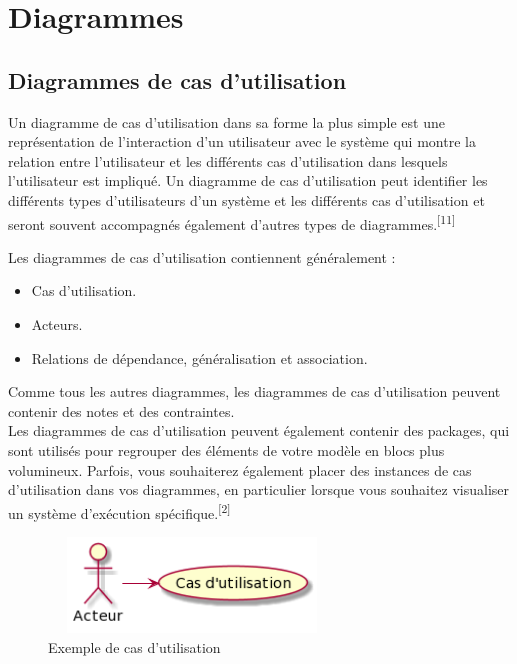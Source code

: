 \documentclass[12pt]{report}
\begin{document}
\newpage

\section{Diagrammes}

\subsection{Diagrammes de cas d'utilisation}

Un diagramme de cas d'utilisation dans sa forme la plus simple est une représentation de l'interaction d'un utilisateur avec le système qui montre la relation entre l'utilisateur et les différents cas d'utilisation dans lesquels l'utilisateur est impliqué. Un diagramme de cas d'utilisation peut identifier les différents types d'utilisateurs d'un système et les différents cas d'utilisation et seront souvent accompagnés également d'autres types de diagrammes.\textsuperscript{[11]}

Les diagrammes de cas d'utilisation contiennent généralement :

\begin{itemize}
\item Cas d'utilisation.
\item Acteurs.
\item Relations de dépendance, généralisation et association.
\end{itemize}

Comme tous les autres diagrammes, les diagrammes de cas d'utilisation peuvent contenir des notes et des contraintes.
\\
Les diagrammes de cas d'utilisation peuvent également contenir des packages, qui sont utilisés pour regrouper des éléments de votre modèle en blocs plus volumineux. Parfois, vous souhaiterez également placer des instances de cas d'utilisation dans vos diagrammes, en particulier lorsque vous souhaitez visualiser un système d'exécution spécifique.\textsuperscript{[2]}

\vspace{0.2in}

\begin{figure}[h]
\centering
    \includegraphics[width = 3.0in, height = 1.0in]{../Images/usecaseEG.png}
    \caption{Exemple de cas d'utilisation}
\end{figure}
\end{document}
